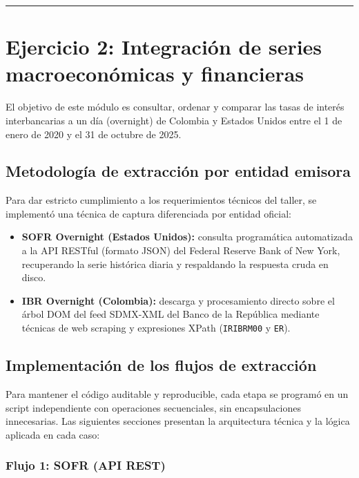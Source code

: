 \documentclass[
  10pt,
  letterpaper,
  DIV=11,
  numbers=noendperiod]{scrartcl}
\providecommand{\tightlist}{%
  \setlength{\itemsep}{0pt}\setlength{\parskip}{0pt}}
\begin{document}
\begin{center}\rule{0.5\linewidth}{0.5pt}\end{center}

\section{Ejercicio 2: Integración de series macroeconómicas y
financieras}\label{ejercicio-2-integraciuxf3n-de-series-macroeconuxf3micas-y-financieras}

El objetivo de este módulo es consultar, ordenar y comparar las tasas de
interés interbancarias a un día (overnight) de Colombia y Estados Unidos
entre el 1 de enero de 2020 y el 31 de octubre de 2025.

\subsection{Metodología de extracción por entidad
emisora}\label{metodologuxeda-de-extracciuxf3n-por-entidad-emisora}

Para dar estricto cumplimiento a los requerimientos técnicos del taller,
se implementó una técnica de captura diferenciada por entidad oficial:

\begin{itemize}
\tightlist
\item
  \textbf{SOFR Overnight (Estados Unidos):} consulta programática
  automatizada a la API RESTful (formato JSON) del Federal Reserve Bank
  of New York, recuperando la serie histórica diaria y respaldando la
  respuesta cruda en disco.
\item
  \textbf{IBR Overnight (Colombia):} descarga y procesamiento directo
  sobre el árbol DOM del feed SDMX-XML del Banco de la República
  mediante técnicas de web scraping y expresiones XPath
  (\texttt{IRIBRM00} y \texttt{ER}).
\end{itemize}

\subsection{Implementación de los flujos de
extracción}\label{sec-flujos-extraccion}

Para mantener el código auditable y reproducible, cada etapa se programó
en un script independiente con operaciones secuenciales, sin
encapsulaciones innecesarias. Las siguientes secciones presentan la
arquitectura técnica y la lógica aplicada en cada caso:

\subsubsection{Flujo 1: SOFR (API REST)}
\end{document}
